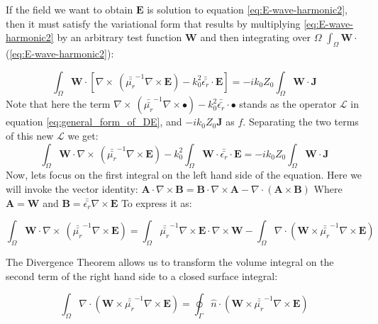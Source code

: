If the field we want to obtain $\mathbf{E}$ is solution to equation \ref{eq:E-wave-harmonic2}, then it must satisfy the variational form that results by multiplying \ref{eq:E-wave-harmonic2} by an arbitrary test function $\mathbf{W}$ and then integrating over $\Omega$ $\int_{\Omega} \mathbf{W} \cdot$(\ref{eq:E-wave-harmonic2}):

\begin{equation}
\int_{\Omega}\mathbf{W}\cdot\left[ \nabla\times\ \left(\bar{\bar{\mu_r}}^{-1}\nabla\times \mathbf{E} \right) - k_0^{2}\bar{\bar{\epsilon_r}}\cdot \mathbf{E}\right]= - ik_0Z_0 \int_{\Omega} \mathbf{W}\cdot\mathbf{J} \label{eq:E-wave-harmonic3} 
\end{equation}
Note that here the term $\nabla\times\ \left(\bar{\bar{\mu_r}}^{-1}\nabla\times \bullet \right) - k_0^{2}\bar{\bar{\epsilon_r}}\cdot \bullet$ stands as the operator $\mathcal{L}$ in equation \ref{eq:general_form_of_DE}, and $- ik_0 Z_0\mathbf{J}$ as $f$. Separating the two terms of this new $\mathcal{L}$ we get:
\begin{equation}
\int_{\Omega}\mathbf{W}\cdot \nabla\times\ \left(\bar{\bar{\mu_r}}^{-1}\nabla\times \mathbf{E} \right) -k_0^{2}\int_{\Omega}\mathbf{W}\cdot \bar{\bar{\epsilon_r}}\cdot \mathbf{E}= - ik_0 Z_0 \int_{\Omega} \mathbf{W}\cdot\mathbf{J} \label{eq:E-wave-harmonic3} 
\end{equation}
Now, lets focus on the first integral on the left hand side of the equation. Here we will invoke the vector identity: $\mathbf{A}\cdot\nabla\times\mathbf{B} = \mathbf{B}\cdot\nabla\times\mathbf{A} - \nabla\cdot(\mathbf{A}\times\mathbf{B})$ 
Where $\mathbf{A}=\mathbf{W}$ and $\mathbf{B}=\bar{\bar{\epsilon_r}}\nabla\times \mathbf{E}$ To express it as:

\begin{equation}
\int_{\Omega}\mathbf{W}\cdot \nabla\times\ \left(\bar{\bar{\mu_r}}^{-1}\nabla\times \mathbf{E} \right) = \int_{\Omega} \bar{\bar{\mu_r}}^{-1}\nabla\times \mathbf{E}\cdot \nabla\times\mathbf{W}-\int_{\Omega}\nabla\cdot
\left(\mathbf{W}\times\bar{\bar{\mu_r}}^{-1}\nabla\times\mathbf{E}
\right) 
\end{equation}

The Divergence Theorem allows us to transform the volume integral on the second term of the right hand side to a closed surface integral:

\begin{equation}
\int_{\Omega}\nabla\cdot
\left(\mathbf{W}\times\bar{\bar{\mu_r}}^{-1}\nabla\times\mathbf{E}
\right) = \oint_{\Gamma}\hat{n}\cdot
\left(\mathbf{W}\times\bar{\bar{\mu_r}}^{-1}\nabla\times\mathbf{E}
\right) 
\end{equation}

